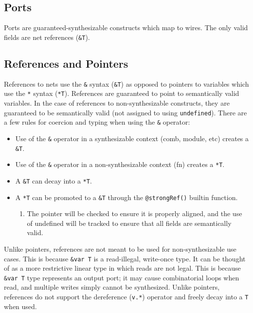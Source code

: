 \documentclass[10pt]{article}
\begin{document}
\subsection{Ports}
Ports are guaranteed-synthesizable constructs which map to wires. The only valid fields are net
references (\verb|&T|).

\subsection{References and Pointers}
References to nets use the \verb|&| syntax (\verb|&T|) as opposed to pointers to variables which use
the \verb|*| syntax (\verb|*T|). References are guaranteed to point to semantically valid variables.
In the case of references to non-synthesizable constructs, they are guaranteed to be semantically
valid (not assigned to using \verb|undefined|). There are a few rules for coercion and typing when using the
\verb|&| operator:

\begin{itemize}
	\item Use of the \verb|&| operator in a synthesizable context (comb, module, etc) creates a \verb|&T|.
	\item Use of the \verb|&| operator in a non-synthesizable context (fn) creates a \verb|*T|.
	\item A \verb|&T| can decay into a \verb|*T|.
	\item A \verb|*T| can be promoted to a \verb|&T| through the \verb|@strongRef()| builtin function.
	      \begin{enumerate}
		      \item The pointer will be checked to ensure it is properly aligned, and the use of undefined
		            will be tracked to ensure that all fields are semantically valid.
	      \end{enumerate}
\end{itemize}

Unlike pointers, references are not meant to be used for non-synthesizable use cases. This is
because \verb|&var T| is a read-illegal, write-once type. It can be thought of as a more restrictive
linear type in which reads are not legal. This is because \verb|&var T| type represents an output
port; it may cause combinatorial loops when read, and multiple writes simply cannot be synthesized.
Unlike pointers, references do not support the dereference (\verb|v.*|) operator and freely decay
into a \verb|T| when used.
\end{document}
